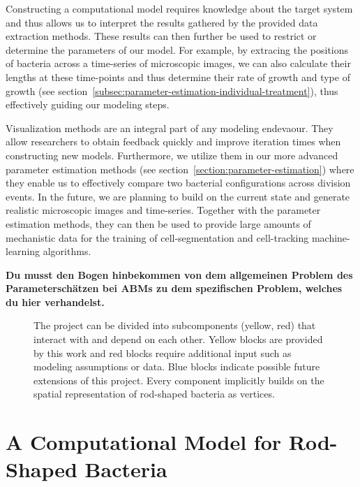 \documentclass[10pt,letterpaper]{article}
\begin{document}
Constructing a computational model requires knowledge about the target system and thus allows us to
interpret the results gathered by the provided data extraction methods.
These results can then further be used to restrict or determine the parameters of our model.
For example, by extracing the positions of bacteria across a time-series of microscopic images, we
can also calculate their lengths at these time-points and thus determine their rate of growth and
type of growth (see section~\ref{subsec:parameter-estimation-individual-treatment}), thus
effectively guiding our modeling steps.

Visualization methods are an integral part of any modeling endevaour.
They allow researchers to obtain feedback quickly and improve iteration times when constructing new
models. Furthermore, we utilize them in our more advanced parameter estimation methods (see
section~\ref{section:parameter-estimation}) where they enable us to effectively compare
two bacterial configurations across division events.
In the future, we are planning to build on the current state and generate realistic microscopic
images and time-series.
Together with the parameter estimation methods, they can then be used to provide large amounts of
mechanistic data for the training of cell-segmentation and cell-tracking machine-learning
algorithms.

\textbf{
    Du musst den Bogen hinbekommen von dem allgemeinen Problem des Parameterschätzen bei ABMs zu dem
    spezifischen Problem, welches du hier verhandelst.
}

\begin{figure}
    \centering
    
    \caption{
        The project can be divided into subcomponents (yellow, red) that interact with and depend on
        each other.
        Yellow blocks are provided by this work and red blocks require additional input such as
        modeling assumptions or data.
        Blue blocks indicate possible future extensions of this project.
        Every component implicitly builds on the spatial representation of rod-shaped bacteria as
        vertices.
    }
    \label{fig:flowchart-project-structure}
\end{figure}

\section{A Computational Model for Rod-Shaped Bacteria}
\label{sec:computational-model}
\end{document}
